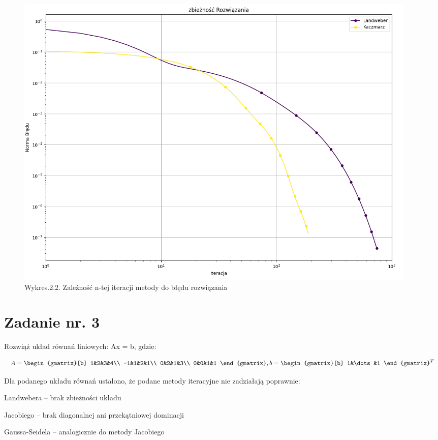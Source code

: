 \documentclass{article}
\begin{document}
\begin{figure}[h]
  \includegraphics[scale=0.7]{Rozco.png}
  \centering
  \captionsetup[Tabela]{name=New Table Name}
  \caption*{Wykres.2.2. Zależność n-tej iteracji metody do błędu rozwiązania}
\end{figure}

\section{Zadanie nr. 3}
Rozwiąż układ równań liniowych: Ax = b, gdzie: 

 

\begin{equation} 
  A= 
  \begin{gmatrix}[b] 
    1&2&3&4\\ 
    -1&1&2&1\\ 
    0&2&1&3\\ 
    0&0&1&1 
  \end{gmatrix} 
  ,  b= 
  \begin{gmatrix}[b] 
    1&\dots&1 
  \end{gmatrix}^T 
\end{equation} 

 

 

Dla podanego układu równań ustalono, że podane metody iteracyjne nie zadziałają poprawnie: 

Landwebera – brak zbieżności układu 

Jacobiego – brak diagonalnej ani przekątniowej dominacji 

Gaussa-Seidela – analogicznie do metody Jacobiego 
\end{document}
